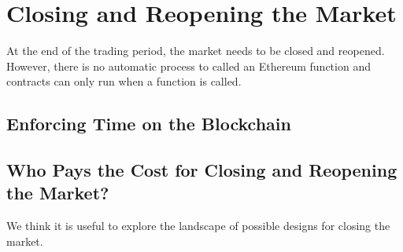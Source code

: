 

\section{Closing and Reopening the Market}


At the end of the trading period, the market needs to be closed and reopened. However, there is no automatic process to called an Ethereum function and contracts can only run when a function is called. 




\subsection{Enforcing Time on the Blockchain}






\subsection{Who Pays the Cost for Closing and Reopening the Market?}

We think it is useful to explore the landscape of possible designs for closing the market. 


